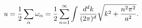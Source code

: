 \begin{equation}
u={1 \over 2} \sum_\alpha \omega_\alpha = {1 \over 2} \sum_{n=1}^{\infty} \int {{d^d k \over {(2 \pi)^d}} \sqrt{k^2 + {n^2 \pi^2 \over a^2}}}.
\end{equation}

